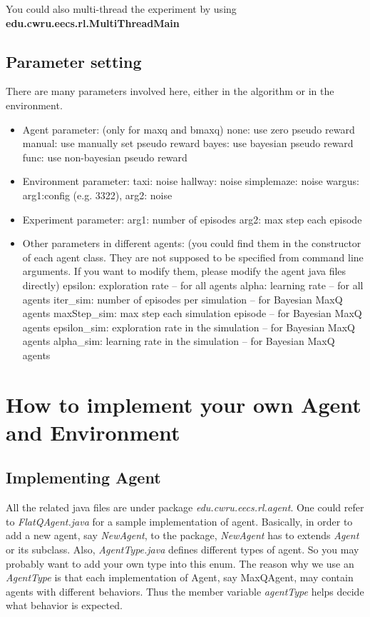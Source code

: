 \documentclass[11pt]{article} %
\begin{document}
You could also multi-thread the experiment by using {\bf edu.cwru.eecs.rl.MultiThreadMain}

\subsection{Parameter setting}
There are many parameters involved here, either in the algorithm or in the environment. 
\begin{itemize}
\item Agent parameter: (only for maxq and bmaxq)
\subitem none: use zero pseudo reward
\subitem manual: use manually set pseudo reward
\subitem bayes: use bayesian pseudo reward
\subitem func: use non-bayesian pseudo reward

\item Environment parameter: 
\subitem taxi: noise
\subitem hallway: noise
\subitem simplemaze: noise
\subitem wargus: arg1:config (e.g. 3322), arg2: noise

\item Experiment parameter: 
\subitem arg1: number of episodes
\subitem arg2: max step each episode

\item Other parameters in different agents: (you could find them in the constructor of each agent class. They are not supposed to be specified from command line arguments. If you want to modify them, please modify the agent java files directly)
\subitem epsilon: exploration rate -- for all agents
\subitem alpha: learning rate -- for all agents
\subitem iter\_sim: number of episodes per simulation -- for Bayesian MaxQ agents 
\subitem maxStep\_sim: max step each simulation episode -- for Bayesian MaxQ agents 
\subitem epsilon\_sim: exploration rate in the simulation -- for Bayesian MaxQ agents 
\subitem alpha\_sim: learning rate in the simulation -- for Bayesian MaxQ agents 

\end{itemize}

\section{How to implement your own Agent and Environment}
\subsection{Implementing Agent}
All the related java files are under package {\it edu.cwru.eecs.rl.agent}. One could refer to {\it FlatQAgent.java} for a sample implementation of agent. Basically, in order to add a new agent, say {\it NewAgent}, to the package, {\it NewAgent} has to extends {\it Agent} or its subclass. Also, {\it AgentType.java} defines different types of agent. So you may probably want to add your own type into this enum. The reason why we use an {\it AgentType} is that each implementation of Agent, say MaxQAgent, may contain agents with different behaviors. Thus the member variable {\it agentType} helps decide what behavior is expected. 
\end{document}
